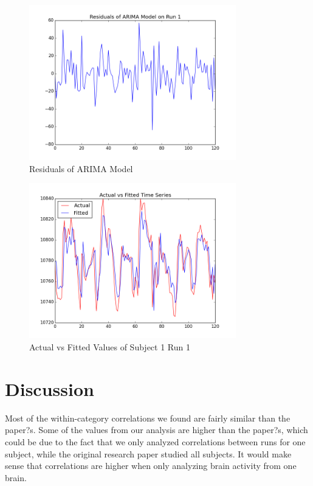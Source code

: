 \documentclass[11pt,twocolumn]{article}
\begin{document}
\begin{figure}[h!]                                                              
\centering                                                                      
\includegraphics[width=90mm]{sub001_run001_residFit.png}                   
\caption{Residuals of ARIMA Model}                                    
\end{figure}

\begin{figure}[h!]                                                              
\centering                                                                      
\includegraphics[width=90mm]{AFTS.png}                   
\caption{Actual vs Fitted Values of Subject 1 Run 1}                                    
\end{figure}


\section{Discussion}

Most of the within-category correlations we found are fairly similar than the 
paper?s. Some of the values from our analysis are higher than the paper?s, 
which could be 
due to the fact that we only analyzed correlations between runs for one 
subject, while the original research paper studied all subjects. It would make 
sense that correlations are higher when only analyzing brain activity from one 
brain. \\
\end{document}
